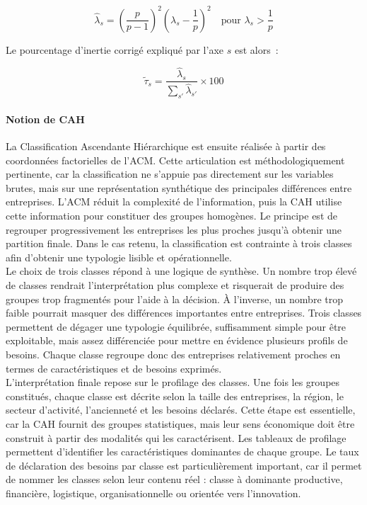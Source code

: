 \documentclass[12pt, a4paper, oneside]{report}
\begin{document}
\begin{enumerate}
	\begin{equation}
		\hat{\lambda}_s =
		\left(\frac{p}{p-1}\right)^2
		\left(\lambda_s - \frac{1}{p}\right)^2
		\quad \text{pour } \lambda_s > \frac{1}{p}
		\label{eq:correction_benzecri}
	\end{equation}
	
	Le pourcentage d'inertie corrig\'e expliqu\'e par l'axe
	$s$ est alors~:
	
	\begin{equation}
		\tilde{\tau}_s =
		\frac{\hat{\lambda}_s}{\displaystyle\sum_{s'} \hat{\lambda}_{s'}}
		\times 100
		\label{eq:tau_corrige}
	\end{equation}
	
	\paragraph{Notion de CAH}
	La Classification Ascendante Hiérarchique est ensuite réalisée à partir des coordonnées factorielles de l’ACM. Cette articulation est méthodologiquement pertinente, car la classification ne s’appuie pas directement sur les variables brutes, mais sur une représentation synthétique des principales différences entre entreprises. L’ACM réduit la complexité de l’information, puis la CAH utilise cette information pour constituer des groupes homogènes. Le principe est de regrouper progressivement les entreprises les plus proches jusqu’à obtenir une partition finale. Dans le cas retenu, la classification est contrainte à trois classes afin d’obtenir une typologie lisible et opérationnelle.\\
	
	Le choix de trois classes répond à une logique de synthèse. Un nombre trop élevé de classes rendrait l’interprétation plus complexe et risquerait de produire des groupes trop fragmentés pour l’aide à la décision. À l’inverse, un nombre trop faible pourrait masquer des différences importantes entre entreprises. Trois classes permettent de dégager une typologie équilibrée, suffisamment simple pour être exploitable, mais assez différenciée pour mettre en évidence plusieurs profils de besoins. Chaque classe regroupe donc des entreprises relativement proches en termes de caractéristiques et de besoins exprimés.\\
	
	L’interprétation finale repose sur le profilage des classes. Une fois les groupes constitués, chaque classe est décrite selon la taille des entreprises, la région, le secteur d’activité, l’ancienneté et les besoins déclarés. Cette étape est essentielle, car la CAH fournit des groupes statistiques, mais leur sens économique doit être construit à partir des modalités qui les caractérisent. Les tableaux de profilage permettent d’identifier les caractéristiques dominantes de chaque groupe. Le taux de déclaration des besoins par classe est particulièrement important, car il permet de nommer les classes selon leur contenu réel : classe à dominante productive, financière, logistique, organisationnelle ou orientée vers l’innovation.\\
	

\end{enumerate}
\end{document}
